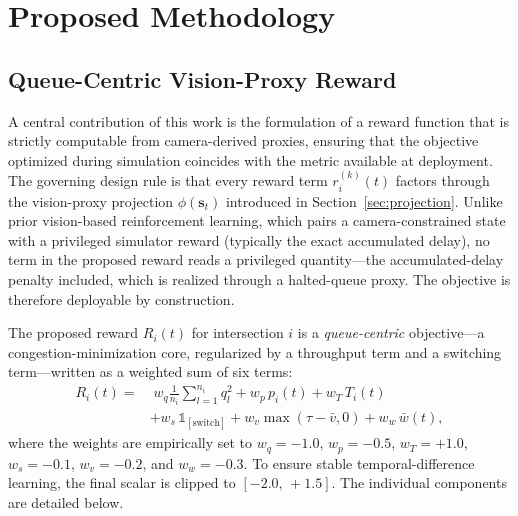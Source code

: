 \section{Proposed Methodology}

\subsection{Queue-Centric Vision-Proxy Reward}
\label{sec:reward}
A central contribution of this work is the formulation of a reward function that is
strictly computable from camera-derived proxies, ensuring that the objective optimized
during simulation coincides with the metric available at deployment. The governing design
rule is that every reward term $r^{(k)}_i(t)$ factors through the vision-proxy projection
$\phi(\mathbf{s}_t)$ introduced in Section~\ref{sec:projection}. Unlike prior vision-based reinforcement
learning, which pairs a camera-constrained state with a privileged simulator reward
(typically the exact accumulated delay), no term in the proposed reward reads a privileged
quantity---the accumulated-delay penalty included, which is realized through a
halted-queue proxy. The objective is therefore deployable by construction.

The proposed reward $R_i(t)$ for intersection $i$ is a \emph{queue-centric} objective---a
congestion-minimization core, regularized by a throughput term and a switching term---written
as a weighted sum of six terms:
\begin{equation}
\begin{aligned}
R_i(t)
=&\;
w_q \frac{1}{n_i}\sum_{l=1}^{n_i} q_l^2
+w_p\, p_i(t)
+w_T\, T_i(t) \\
&+
w_s\, \mathbb{1}_{[\text{switch}]}
+w_v \max(\tau-\bar{v},0)
+w_w\, \bar{w}(t),
\end{aligned}
\label{eq:reward}
\end{equation}
where the weights are empirically set to
$w_q=-1.0$,
$w_p=-0.5$,
$w_T=+1.0$,
$w_s=-0.1$,
$w_v=-0.2$,
and
$w_w=-0.3$.
To ensure stable temporal-difference learning, the final scalar is clipped to
$[-2.0,\, +1.5]$. The individual components are detailed below.

